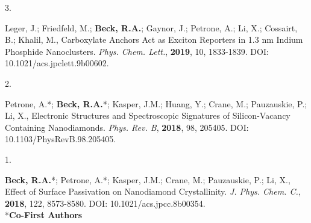 \begin{cvpublications}



\cvpublication
{3.}
{\parbox[t]{0.95\textwidth}{\strut Leger, J.; Friedfeld, M.; \textbf{Beck, R.A.}; Gaynor, J.; Petrone, A.; Li, X.; Cossairt, B.; Khalil, M., 
Carboxylate Anchors Act as Exciton Reporters in 1.3 nm Indium Phosphide Nanoclusters.
\textit{Phys. Chem. Lett.}, \textbf{2019}, 10, 1833-1839.
DOI: 10.1021/acs.jpclett.9b00602.}}




\cvpublication
{2.}
{\parbox[t]{0.95\textwidth}{\strut Petrone, A.*; \textbf{Beck, R.A.}*; Kasper, J.M.; Huang, Y.; Crane, M.; Pauzauskie, P.; Li, X., 
Electronic Structures and Spectroscopic Signatures of Silicon-Vacancy Containing Nanodiamonds.
\textit{Phys. Rev. B}, \textbf{2018}, 98, 205405.
DOI: 10.1103/PhysRevB.98.205405.}}




\cvpublication
{1.}
{\parbox[t]{0.95\textwidth}{\strut \textbf{Beck, R.A.}*; Petrone, A.*; Kasper, J.M.; Crane, M.; Pauzauskie, P.; Li, X., 
Effect of Surface Passivation on Nanodiamond Crystallinity.
\textit{J. Phys. Chem. C.}, \textbf{2018}, 122, 8573-8580.
DOI: 10.1021/acs.jpcc.8b00354. \\ \**\textbf{Co-First Authors}}}



\end{cvpublications}
